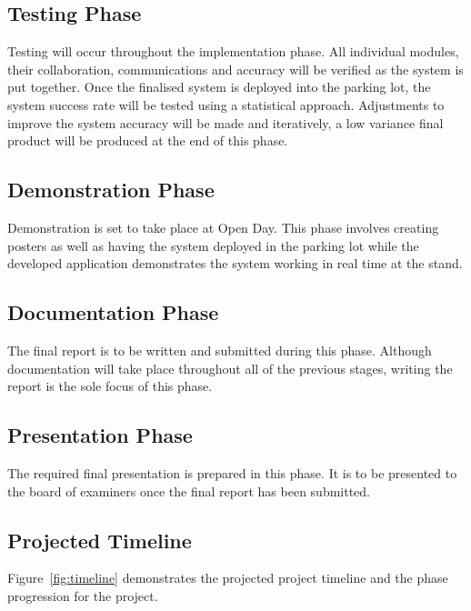 \documentclass[10pt,twocolumn]{witseiepaper}
\begin{document}
	\subsection{Testing Phase}
		Testing will occur throughout the implementation phase. All individual modules, their collaboration, communications and accuracy will be verified as the system is put together. Once the finalised system is deployed into the parking lot, the system success rate will be tested using a statistical approach. Adjustments to improve the system accuracy will be made and iteratively, a low variance final product will be produced at the end of this phase.
		
	\subsection{Demonstration Phase}
		Demonstration is set to take place at Open Day. This phase involves creating posters as well as having the system deployed in the parking lot while the developed application demonstrates the system working in real time at the stand.
	
	\subsection{Documentation Phase}
		The final report is to be written and submitted during this phase. Although documentation will take place throughout all of the previous stages, writing the report is the sole focus of this phase.
	
	\subsection{Presentation Phase}
		The required final presentation is prepared in this phase. It is to be presented to the board of examiners once the final report has been submitted.
	
	\subsection{Projected Timeline}
	Figure~\ref{fig:timeline} demonstrates the projected project timeline and the phase progression for the project.
	
\end{document}
